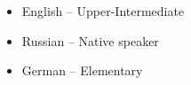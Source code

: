 






\begin{itemize}
	\item English -- Upper-Intermediate
	\item Russian -- Native speaker
    \item German -- Elementary
\end{itemize}

